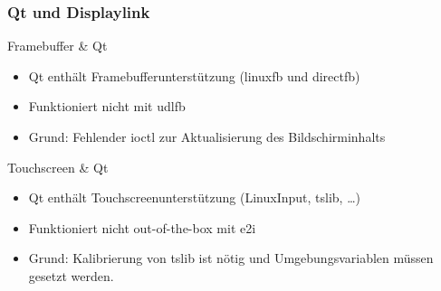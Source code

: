 \documentclass{beamer}
\begin{document}
	\begin{frame}
		\frametitle{Qt und Displaylink}
    \begin{block}{Framebuffer \& Qt}
      \begin{itemize}
        \item Qt enthält Framebufferunterstützung (linuxfb und directfb)
        \item Funktioniert nicht mit udlfb
        \item Grund: Fehlender ioctl zur Aktualisierung des Bildschirminhalts
      \end{itemize}
    \end{block}
    \begin{block}{Touchscreen \& Qt}
        \begin{itemize}
          \item Qt enthält Touchscreenunterstützung (LinuxInput, tslib, \ldots)
          \item Funktioniert nicht out-of-the-box mit e2i
          \item Grund: Kalibrierung von tslib ist nötig und Umgebungsvariablen müssen gesetzt
            werden.
        \end{itemize}
    \end{block}
	\end{frame}
	
\end{document}
